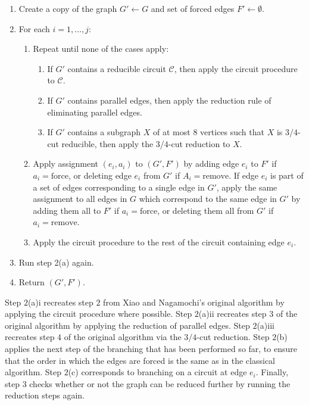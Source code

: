 \begin{enumerate}
\item Create a copy of the graph $G' \leftarrow G$ and set of forced edges $F' \leftarrow \emptyset$.
\item For each $i=1,\dots,j$:%
\begin{enumerate}
\item Repeat until none of the cases apply:
\begin{enumerate}
\item If $G'$ contains a reducible circuit $\mathcal{C}$, then apply the circuit procedure to $\mathcal{C}$.
\item If $G'$ contains parallel edges, then apply the reduction rule of eliminating parallel edges.
\item If $G'$ contains a subgraph $X$ of at most $8$ vertices such that $X$ is $3/4$-cut reducible, then apply the $3$/$4$-cut reduction to $X$.
\end{enumerate}
\item Apply assignment $(e_i, a_i)$ to $(G', F')$ by adding edge $e_i$ to $F'$ if $a_i = \text{force}$, or deleting edge $e_i$ from $G'$ if $A_i = \text{remove}$. If edge $e_i$ is part of a set of edges corresponding to a single edge in $G'$, apply the same assignment to all edges in $G$ which correspond to the same edge in $G'$ by adding them all to $F'$ if $a_i = \text{force}$, or deleting them all from $G'$ if $a_i = \text{remove}$.
\item Apply the circuit procedure to the rest of the circuit containing edge $e_i$.
\end{enumerate}
\item Run step 2(a) again.
\item Return $(G', F')$.
\end{enumerate}

Step $2$(a)i recreates step $2$ from Xiao and Nagamochi's original algorithm by applying the circuit procedure where possible. Step $2$(a)ii recreates step $3$ of the original algorithm by applying the reduction of parallel edges. Step $2$(a)iii recreates step $4$ of the original algorithm via the $3/4$-cut reduction. Step $2$(b) applies the next step of the branching that has been performed so far, to ensure that the order in which the edges are forced is the same as in the classical algorithm. Step $2$(c) corresponds to branching on a circuit at edge $e_i$. Finally, step $3$ checks whether or not the graph can be reduced further by running the reduction steps again.

